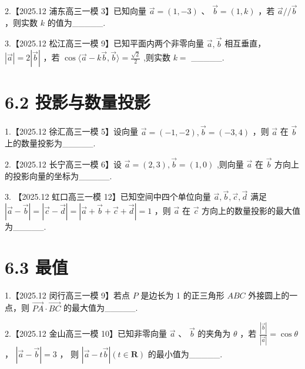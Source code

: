 \documentclass[10pt]{article}
\begin{document}
2.【2025.12 浦东高三一模 3】已知向量 \(\overrightarrow{a} = \left( {1, - 3}\right)\) 、 \(\overrightarrow{b} = \left( {1,k}\right)\) ，若 \(\overrightarrow{a}//\overrightarrow{b}\) ，则实数 \(k\) 的值为\_\_\_\_\_.

3.【2025.12 松江高三一模 9】已知平面内两个非零向量 \(\overrightarrow{a},\overrightarrow{b}\) 相互垂直， \(\left| \overrightarrow{a}\right|  = 2\left| \overrightarrow{b}\right|\) ，若 \(\cos \langle \overrightarrow{a} - k\overrightarrow{b},\overrightarrow{b}\rangle  = \frac{\sqrt{2}}{2}\) ,则实数 \(k =\) \_\_\_\_\_.

\section*{6.2 投影与数量投影}

1.【2025.12 徐汇高三一模 5】设向量 \(\overrightarrow{a} = \left( {-1, - 2}\right) ,\overrightarrow{b} = \left( {-3,4}\right)\) ，则 \(\overrightarrow{a}\) 在 \(\overrightarrow{b}\) 上的数量投影为\_\_\_\_\_.

2.【2025.12 长宁高三一模 6】设 \(\overrightarrow{a} = \left( {2,3}\right) ,\overrightarrow{b} = \left( {1,0}\right)\) ,则向量 \(\overrightarrow{a}\) 在 \(\overrightarrow{b}\) 方向上的投影向量的坐标为\_\_\_\_\_.

3. 【2025.12 虹口高三一模 12】已知空间中四个单位向量 \(\overrightarrow{a},\overrightarrow{b},\overrightarrow{c},\overrightarrow{d}\) 满足 \(\left| {\overrightarrow{a} - \overrightarrow{b}}\right|  = \left| {\overrightarrow{c} - \overrightarrow{d}}\right|  = \left| {\overrightarrow{a} + \overrightarrow{b} + \overrightarrow{c} + \overrightarrow{d}}\right|  = 1\) ，则 \(\overrightarrow{a}\) 在 \(\overrightarrow{c}\) 方向上的数量投影的最大值为\_\_\_\_\_.

\section*{6.3 最值}

1.【2025.12 闵行高三一模 9】若点 \(P\) 是边长为 1 的正三角形 \({ABC}\) 外接圆上的一点，则 \(\overrightarrow{PA} \cdot  \overrightarrow{BC}\) 的最大值为\_\_\_\_\_.

2.【2025.12 金山高三一模 10】已知非零向量 \(\overrightarrow{a}\) 、 \(\overrightarrow{b}\) 的夹角为 \(\theta\) ，若 \(\frac{\left| \overrightarrow{b}\right| }{\left| \overrightarrow{a}\right| } = \cos \theta\) ， \(\left| {\overrightarrow{a} - \overrightarrow{b}}\right|  = 3\) ， 则 \(\left| {\overrightarrow{a} - t\overrightarrow{b}}\right| \left( {t \in  \mathbf{R}}\right)\) 的最小值为\_\_\_\_\_.
\end{document}
